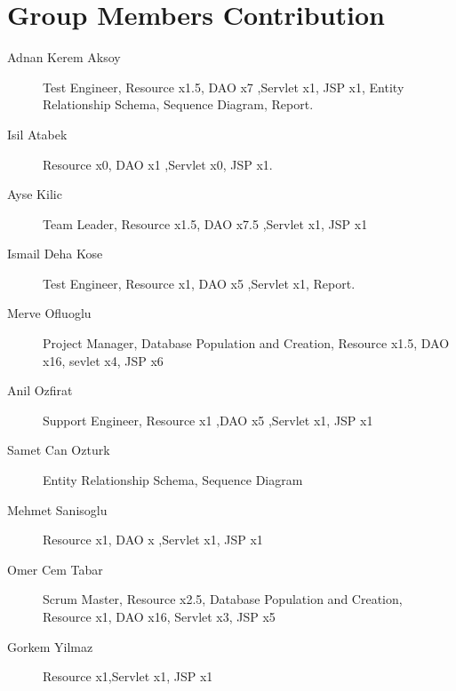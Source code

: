 \section{Group Members Contribution}


\begin{description}
	\item[Adnan Kerem Aksoy] Test Engineer, Resource x1.5, DAO x7 ,Servlet x1, JSP x1, Entity Relationship Schema, Sequence Diagram, Report.
	\item[Isil Atabek] Resource x0, DAO x1 ,Servlet x0, JSP x1.
	\item[Ayse Kilic] Team Leader, Resource x1.5, DAO x7.5 ,Servlet x1, JSP x1
	\item[Ismail Deha Kose] Test Engineer, Resource x1, DAO x5 ,Servlet x1, Report.
 	\item[Merve Ofluoglu] Project Manager, Database Population and Creation, Resource x1.5, DAO x16, sevlet x4, JSP x6
	\item[Anil Ozfirat] Support Engineer, Resource x1 ,DAO x5 ,Servlet x1, JSP x1
 	\item[Samet Can Ozturk] Entity Relationship Schema, Sequence Diagram
  	\item[Mehmet Sanisoglu] Resource x1, DAO x ,Servlet x1, JSP x1
   	\item[Omer Cem Tabar] Scrum Master, Resource x2.5, Database Population and Creation, Resource x1, DAO x16, Servlet x3, JSP x5
	\item[Gorkem Yilmaz] Resource x1,Servlet x1, JSP x1

\end{description}
